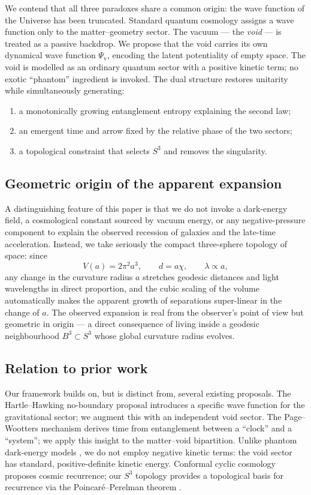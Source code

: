 \documentclass[12pt,a4paper]{article}
\theoremstyle{plain}
\theoremstyle{definition}
\newcommand{\Psiv}{\Psi_{\mathrm{v}}}
\begin{document}
We contend that all three paradoxes share a common origin: the wave function
of the Universe has been truncated. Standard quantum cosmology assigns a
wave function only to the matter--geometry sector. The vacuum --- the
\emph{void} --- is treated as a passive backdrop. We propose that the void
carries its own dynamical wave function $\Psiv$, encoding the latent
potentiality of empty space. The void is modelled as an ordinary quantum
sector with a positive kinetic term; no exotic ``phantom'' ingredient is
invoked. The dual structure restores unitarity while simultaneously
generating:
\begin{enumerate}[label=(\alph*)]
  \item a monotonically growing entanglement entropy explaining the second
        law;
  \item an emergent time and arrow fixed by the relative phase of the two
        sectors;
  \item a topological constraint that selects $S^3$ and removes the
        singularity.
\end{enumerate}

\subsection{Geometric origin of the apparent expansion}

A distinguishing feature of this paper is that we do not invoke a
dark-energy field, a cosmological constant sourced by vacuum energy,
or any negative-pressure component to explain the observed recession of
galaxies and the late-time acceleration. Instead, we take seriously the
compact three-sphere topology of space: since
\[
  V(a) = 2\pi^2 a^3,\qquad d = a\chi,\qquad \lambda \propto a,
\]
any change in the curvature radius $a$ stretches geodesic distances and
light wavelengths in direct proportion, and the cubic scaling of the
volume automatically makes the apparent growth of separations super-linear
in the change of $a$. The observed expansion is real from the observer's
point of view but geometric in origin --- a direct consequence of living
inside a geodesic neighbourhood $B^3\subset S^3$ whose global curvature
radius evolves.

\subsection{Relation to prior work}

Our framework builds on, but is distinct from, several existing proposals.
The Hartle--Hawking no-boundary proposal \cite{HartleHawking1983} introduces
a specific wave function for the gravitational sector; we augment this with
an independent void sector. The Page--Wootters mechanism
\cite{PageWootters1983,Giovannetti2015} derives time from entanglement
between a ``clock'' and a ``system''; we apply this insight to the
matter--void bipartition. Unlike phantom dark-energy models
\cite{Caldwell2002}, we do not employ negative kinetic terms: the void
sector has standard, positive-definite kinetic energy. Conformal cyclic
cosmology \cite{Penrose2010} proposes cosmic recurrence; our $S^3$ topology
provides a topological basis for recurrence via the Poincar\'e--Perelman
theorem \cite{PerelmanI,PerelmanII,PerelmanIII}.
\end{document}
